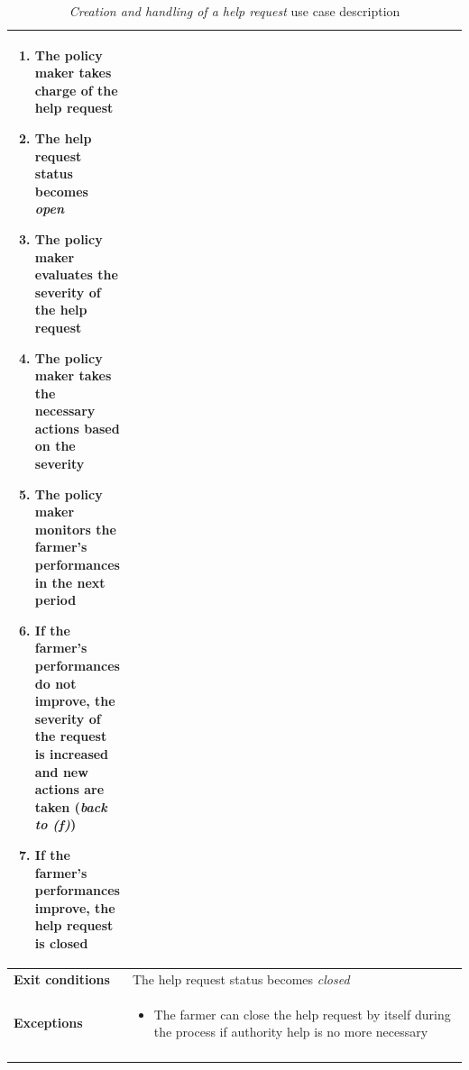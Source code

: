 \documentclass[10pt]{article}
\begin{document}
\begin{enumerate}[label=\textbf{UC\arabic*}]
\begin{longtable}{p{0.26\linewidth}p{0.75\linewidth}}
\begin{enumerate}
                \item The policy maker takes charge of the help request
                \item The help request status becomes \textit{open}
                \item The policy maker evaluates the severity of the help request
                \item The policy maker takes the necessary actions based on the severity
                \item The policy maker monitors the farmer's performances in the next period
                \item If the farmer's performances do not improve, the severity of the request is increased and new actions are taken (\textit{back to (f)})
                \item If the farmer's performances improve, the help request is closed 
            \end{enumerate} \\
            \midrule
            \textbf{Exit conditions} & The help request status becomes \textit{closed}\\
            \midrule
            \textbf{Exceptions} & 
            \begin{itemize}
                \item The farmer can close the help request by itself during the process if authority help is no more necessary
            \end{itemize} \\
            \bottomrule
            \caption{\emph{Creation and handling of a help request} use case description}
        \end{longtable}
    \newpage
        \begin{figure}[ht!]
            \centering

\end{figure}
\end{enumerate}
\end{document}
